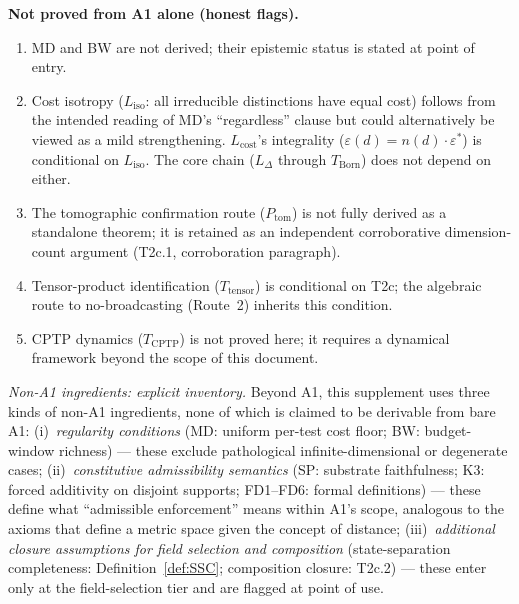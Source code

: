 \documentclass[11pt,a4paper]{article}
\theoremstyle{definition}
\newcommand{\eps}{\varepsilon}
\begin{document}
\begin{tcolorbox}[apfbox, title={What Is Assumed, What Is Proved, What Is Deferred}]
\smallskip\noindent\textbf{Not proved from A1 alone (honest flags).}
\begin{enumerate}[nosep,label=\arabic*.,leftmargin=2em]
\item MD and BW are not derived; their epistemic status is stated at point of entry.
\item Cost isotropy ($L_{\mathrm{iso}}$: all irreducible distinctions have equal cost) follows from the intended reading of MD's ``regardless'' clause but could alternatively be viewed as a mild strengthening.  $L_{\mathrm{cost}}$'s integrality ($\eps(d) = n(d) \cdot \eps^*$) is conditional on $L_{\mathrm{iso}}$.  The core chain ($L_\Delta$ through $T_{\mathrm{Born}}$) does not depend on either.
\item The tomographic confirmation route ($P_{\mathrm{tom}}$) is not fully derived as a standalone theorem; it is retained as an independent corroborative dimension-count argument (T2c.1, corroboration paragraph).
\item Tensor-product identification ($T_{\mathrm{tensor}}$) is conditional on T2c; the algebraic route to no-broadcasting (Route~2) inherits this condition.
\item CPTP dynamics ($T_{\mathrm{CPTP}}$) is not proved here; it requires a dynamical framework beyond the scope of this document.
\end{enumerate}
\end{tcolorbox}

\smallskip\noindent\textit{Non-A1 ingredients: explicit inventory.}  Beyond A1, this supplement uses three kinds of non-A1 ingredients, none of which is claimed to be derivable from bare A1:  (i)~\emph{regularity conditions} (MD: uniform per-test cost floor; BW: budget-window richness) --- these exclude pathological infinite-dimensional or degenerate cases;  (ii)~\emph{constitutive admissibility semantics} (SP: substrate faithfulness; K3: forced additivity on disjoint supports; FD1--FD6: formal definitions) --- these define what ``admissible enforcement'' means within A1's scope, analogous to the axioms that define a metric space given the concept of distance;  (iii)~\emph{additional closure assumptions for field selection and composition} (state-separation completeness: Definition~\ref{def:SSC}; composition closure: T2c.2) --- these enter only at the field-selection tier and are flagged at point of use.
\end{document}
